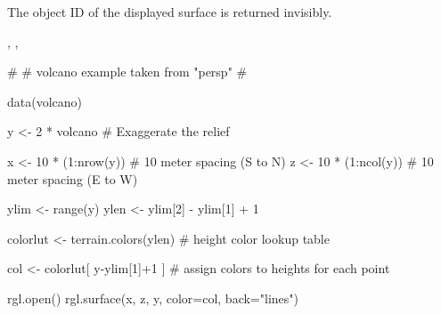 \documentclass{article}
\begin{document}
\begin{Value}
The object ID of the displayed surface is returned invisibly.
\end{Value}
\begin{SeeAlso}\relax
{}, , 
\end{SeeAlso}
\begin{Examples}
\begin{ExampleCode}

#
# volcano example taken from "persp"
#

data(volcano)

y <- 2 * volcano        # Exaggerate the relief

x <- 10 * (1:nrow(y))   # 10 meter spacing (S to N)
z <- 10 * (1:ncol(y))   # 10 meter spacing (E to W)

ylim <- range(y)
ylen <- ylim[2] - ylim[1] + 1

colorlut <- terrain.colors(ylen) # height color lookup table

col <- colorlut[ y-ylim[1]+1 ] # assign colors to heights for each point

rgl.open()
rgl.surface(x, z, y, color=col, back="lines")

\end{ExampleCode}
\end{Examples}
\end{document}
